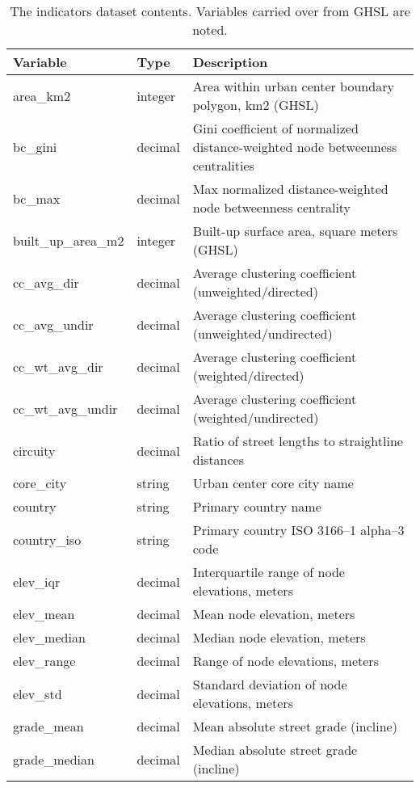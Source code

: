 \documentclass[12pt,letterpaper]{article} %
\begin{document}
\begin{table}[bth!]
    \centering
    \scriptsize
    \caption{The indicators dataset contents. Variables carried over from GHSL are noted.}\label{tab:indicators}
    \begin{tabular}{p{3.0cm} p{1.0cm} p{8.2cm}}
        \toprule
        Variable                      & Type    & Description \\
        \midrule
        area\_km2 & integer & Area within urban center boundary polygon, km2 (GHSL) \\
        bc\_gini & decimal & Gini coefficient of normalized distance-weighted node betweenness centralities \\
        bc\_max & decimal & Max normalized distance-weighted node betweenness centrality \\
        built\_up\_area\_m2 & integer & Built-up surface area, square meters (GHSL) \\
        cc\_avg\_dir & decimal & Average clustering coefficient (unweighted/directed) \\
        cc\_avg\_undir & decimal & Average clustering coefficient (unweighted/undirected) \\
        cc\_wt\_avg\_dir & decimal & Average clustering coefficient (weighted/directed) \\
        cc\_wt\_avg\_undir & decimal & Average clustering coefficient (weighted/undirected) \\
        circuity & decimal & Ratio of street lengths to straightline distances \\
        core\_city & string & Urban center core city name \\
        country & string & Primary country name \\
        country\_iso & string & Primary country ISO 3166--1 alpha--3 code \\
        elev\_iqr & decimal & Interquartile range of node elevations, meters \\
        elev\_mean & decimal & Mean node elevation, meters \\
        elev\_median & decimal & Median node elevation, meters \\
        elev\_range & decimal & Range of node elevations, meters \\
        elev\_std & decimal & Standard deviation of node elevations, meters \\
        grade\_mean & decimal & Mean absolute street grade (incline) \\
        grade\_median & decimal & Median absolute street grade (incline) \\

\end{tabular}
\end{table}
\end{document}
